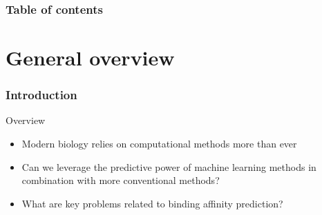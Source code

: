 \documentclass{beamer}
\begin{document}

\begin{frame}\frametitle{Table of contents}\tableofcontents
\end{frame}


\section{General overview} 

\begin{frame}\frametitle{Introduction} 

  \begin{block}{Overview}
    \begin{itemize}

    \item Modern biology relies on computational methods more than ever
    \item Can we leverage the predictive power of machine learning methods in combination with more conventional methods?
    \item What are key problems related to binding affinity prediction?
      
    \end{itemize}
  \end{block}
  
\end{frame}
\end{document}
